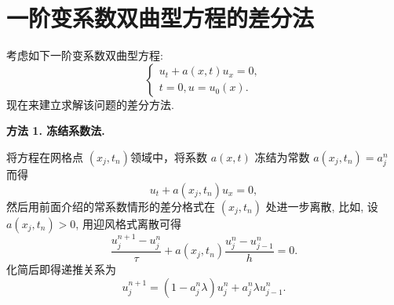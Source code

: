 \section{一阶变系数双曲型方程的差分法}

考虑如下一阶变系数双曲型方程:
\begin{equation}\label{eq:variable-coefficient-hyperbolic}
    \begin{cases}
        u_t + a(x,t)u_x = 0, \\
        t=0, u=u_0(x).
    \end{cases}
\end{equation}
现在来建立求解该问题的差分方法.

\textbf{方法 1. 冻结系数法.}

将方程在网格点 $(x_j, t_n)$领域中，将系数 $a(x,t)$ 冻结为常数 $a(x_j, t_n)=a_{j}^n$ 而得
\begin{equation*}
    u_t + a(x_j, t_n)u_x = 0,
\end{equation*}
然后用前面介绍的常系数情形的差分格式在 $(x_j, t_n)$ 处进一步离散, 比如, 设 $a(x_j, t_n) > 0$, 用迎风格式离散可得
\begin{equation}\label{eq:upwind-variable}
    \frac{u_j^{n+1} - u_j^n}{\tau} + a(x_j, t_n)\frac{u_j^n - u_{j-1}^n}{h} = 0.
\end{equation}
化简后即得递推关系为
\begin{equation*}
    u_j^{n+1} = (1 - a_{j}^n\lambda) u_j^n + a_{j}^n\lambda u_{j-1}^n.
\end{equation*}

